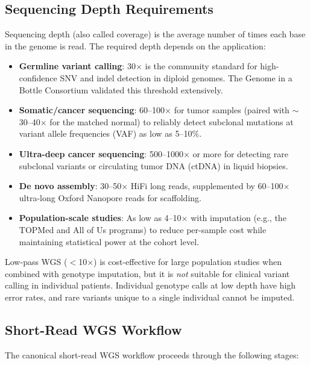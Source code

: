 \subsection{Sequencing Depth Requirements}
\label{subsec:depth}

Sequencing depth (also called coverage) is the average number of times each base in the genome is read. The required depth depends on the application:

\begin{itemize}[nosep]
  \item \textbf{Germline variant calling}: 30$\times$ is the community standard for high-confidence SNV and indel detection in diploid genomes. The Genome in a Bottle Consortium validated this threshold extensively.
  \item \textbf{Somatic/cancer sequencing}: 60--100$\times$ for tumor samples (paired with $\sim$30--40$\times$ for the matched normal) to reliably detect subclonal mutations at variant allele frequencies (VAF) as low as 5--10\%.
  \item \textbf{Ultra-deep cancer sequencing}: 500--1000$\times$ or more for detecting rare subclonal variants or circulating tumor DNA (ctDNA) in liquid biopsies.
  \item \textbf{De novo assembly}: 30--50$\times$ HiFi long reads, supplemented by 60--100$\times$ ultra-long Oxford Nanopore reads for scaffolding.
  \item \textbf{Population-scale studies}: As low as 4--10$\times$ with imputation (e.g., the TOPMed and All of Us programs) to reduce per-sample cost while maintaining statistical power at the cohort level.
\end{itemize}

\begin{warningbox}[title={Low-Pass WGS Limitations}]
Low-pass WGS ($<$10$\times$) is cost-effective for large population studies when combined with genotype imputation, but it is \emph{not} suitable for clinical variant calling in individual patients. Individual genotype calls at low depth have high error rates, and rare variants unique to a single individual cannot be imputed.
\end{warningbox}

\subsection{Short-Read WGS Workflow}

The canonical short-read WGS workflow proceeds through the following stages:

